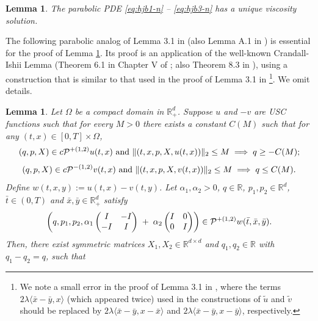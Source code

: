 \documentclass[11pt]{article}
\theoremstyle{definition}
\theoremstyle{plain}
\newtheorem{lemma}[assumption]{Lemma}
\newcommand{\R}{\mathbb{R}}
\newcommand{\cP}{{\cal P}}
\begin{document}
\begin{appendices}
\begin{lemma}\label{lem:unique-viscosity-n}
The parabolic PDE \eqref{eq:hjb1-n} -- \eqref{eq:hjb3-n} has a unique viscosity solution.
\end{lemma}

The following parabolic analog of Lemma 3.1 in \cite{DupuisIshii1991} 
(also Lemma A.1 in \cite{borkar2004ergodic}) is essential for the proof of Lemma \ref{lem:unique-viscosity-n}. 
Its proof is an application of the well-known Crandall-Ishii Lemma (Theorem 6.1 in Chapter V of \cite{FlemingSoner2006}; 
also Theorem 8.3 in \cite{CrandallIshiiLions1992}), 
using a construction that is similar to that used in the proof of Lemma 3.1 in \cite{DupuisIshii1990}\footnote{
We note a small error in the proof of Lemma 3.1 in \cite{DupuisIshii1990}, 
where the terms $2\lambda \langle \bar x-\bar y, x\rangle$ (which appeared twice) used 
in the constructions of $\tilde u$ and $\tilde v$ should be replaced by $2\lambda \langle \bar x-\bar y, x-\bar x\rangle$ 
and $2\lambda \langle \bar x-\bar y, x-\bar y\rangle$, respectively.}.
We omit details.
\begin{lemma}\label{lem:crandall-ishii-parabolic}
Let $\Omega$ be a compact domain in $\R_+^d$.
Suppose $u$ and $-v$ are USC functions such that for every $M>0$ there exists a constant $C(M)$ such that 
for any $(t,x) \in [0,T]\times \Omega$, 
\begin{equation}
  (q,p,X) \in c\cP^{+(1,2)} u(t,x) \text{ and } \|(t,x,p,X,u(t,x))\|_2 \leq M\implies q \geq -C(M);
\end{equation}
\begin{equation}
  (q,p,X) \in c\cP^{-(1,2)} v(t,x) \text{ and } \|(t,x,p,X,v(t,x))\|_2 \leq M \implies q \leq C(M).
\end{equation}
Define $w(t,x,y) := u(t,x) - v(t,y)$. Let $\alpha_1, \alpha_2 > 0$, $q \in \R$, $p_1, p_2 \in \R^d$, 
$\bar t \in (0,T)$ and $\bar x, \bar y \in \R_+^d$ satisfy 
\begin{equation}
\left(q, p_1, p_2, \alpha_1
\begin{pmatrix}
I & -I\\
-I & I
\end{pmatrix}
\;+\;
\alpha_2
\begin{pmatrix}
I & 0\\
0 & I
\end{pmatrix}
\right) \in \cP^{+(1,2)} w(\bar t, \bar x, \bar y).
\end{equation}
Then, there exist symmetric matrices $X_1, X_2 \in \R^{d\times d}$ and $q_1, q_2 \in \R$ with $q_1-q_2 = q$, such that 

\end{lemma}
\end{appendices}
\end{document}
